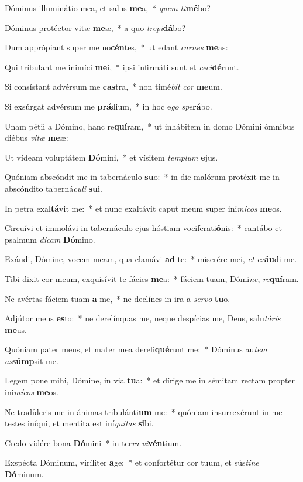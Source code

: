 \item Dóminus illuminátio mea, et salus \textbf{me}a,~* \textit{quem} \textit{ti}\textbf{mé}bo?
\item Dóminus protéctor vitæ \textbf{me}æ,~* a quo \textit{tre}\textit{pi}\textbf{dá}bo?
\item Dum apprópiant super me no\textbf{cén}tes,~* ut edant \textit{car}\textit{nes} \textbf{me}as:
\item Qui tríbulant me inimíci \textbf{me}i,~* ipsi infirmáti sunt et \textit{ce}\textit{ci}\textbf{dé}runt.
\item Si consístant advérsum me \textbf{cas}tra,~* non timé\textit{bit} \textit{cor} \textbf{me}um.
\item Si exsúrgat advérsum me \textbf{prǽ}lium,~* in hoc e\textit{go} \textit{spe}\textbf{rá}bo.
\item Unam pétii a Dómino, hanc re\textbf{quí}ram,~* ut inhábitem in domo Dómini ómnibus diébus \textit{vi}\textit{tæ} \textbf{me}æ:
\item Ut vídeam voluptátem \textbf{Dó}mini,~* et vísitem \textit{tem}\textit{plum} \textbf{e}jus.
\item Quóniam abscóndit me in tabernáculo \textbf{su}o:~* in die malórum protéxit me in abscóndito taberná\textit{cu}\textit{li} \textbf{su}i.
\item In petra exal\textbf{tá}vit me:~* et nunc exaltávit caput meum super ini\textit{mí}\textit{cos} \textbf{me}os.
\item Circuívi et immolávi in tabernáculo ejus hóstiam vociferati\textbf{ó}nis:~* cantábo et psalmum \textit{di}\textit{cam} \textbf{Dó}mino.
\item Exáudi, Dómine, vocem meam, qua clamávi \textbf{ad} te:~* miserére mei, \textit{et} \textit{ex}\textbf{áu}di me.
\item Tibi dixit cor meum, exquisívit te fácies \textbf{me}a:~* fáciem tuam, Dómi\textit{ne}, \textit{re}\textbf{quí}ram.
\item Ne avértas fáciem tuam \textbf{a} me,~* ne declínes in ira a \textit{ser}\textit{vo} \textbf{tu}o.
\item Adjútor meus \textbf{es}to:~* ne derelínquas me, neque despícias me, Deus, salu\textit{tá}\textit{ris} \textbf{me}us.
\item Quóniam pater meus, et mater mea dereli\textbf{qué}runt me:~* Dóminus au\textit{tem} \textit{as}\textbf{súmp}sit me.
\item Legem pone mihi, Dómine, in via \textbf{tu}a:~* et dírige me in sémitam rectam propter ini\textit{mí}\textit{cos} \textbf{me}os.
\item Ne tradíderis me in ánimas tribulánti\textbf{um} me:~* quóniam insurrexérunt in me testes iníqui, et mentíta est iní\textit{qui}\textit{tas} \textbf{si}bi.
\item Credo vidére bona \textbf{Dó}mini~* in ter\textit{ra} \textit{vi}\textbf{vén}tium.
\item Exspécta Dóminum, viríliter \textbf{a}ge:~* et confortétur cor tuum, et sús\textit{ti}\textit{ne} \textbf{Dó}minum.
